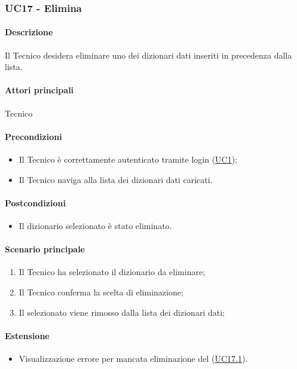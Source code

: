 \subsubsection{UC17 - Elimina }\label{UC17}
\paragraph*{Descrizione}
Il Tecnico desidera eliminare uno dei dizionari dati inseriti in precedenza dalla lista.

\paragraph*{Attori principali}
Tecnico

\paragraph*{Precondizioni}
\begin{itemize}
  \item Il Tecnico è correttamente autenticato tramite login (\hyperref[UC1]{UC1});
  \item Il Tecnico naviga alla lista dei dizionari dati caricati.  
\end{itemize}

\paragraph*{Postcondizioni}
\begin{itemize}
  \item Il dizionario selezionato è stato eliminato.
\end{itemize}

\paragraph*{Scenario principale}
\begin{enumerate}
  \item Il Tecnico ha selezionato il dizionario da eliminare;
  \item Il Tecnico conferma la scelta di eliminazione;
  \item Il  selezionato viene rimosso dalla lista dei dizionari dati;  
\end{enumerate}

\paragraph*{Estensione}
\begin{itemize}
  \item Visualizzazione errore per mancata eliminazione del  (\hyperref[UC17point1]{UC17.1}).
\end{itemize}

